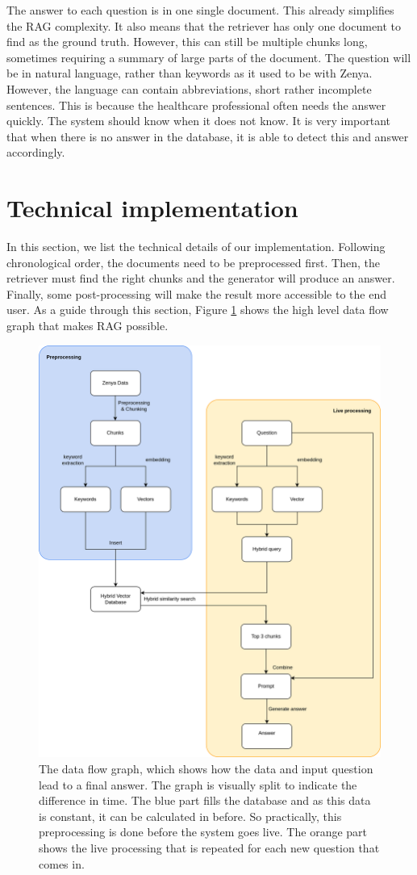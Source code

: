 The answer to each question is in one single document. This already simplifies the RAG complexity. It also means that the retriever has only one document to find as the ground truth. However, this can still be multiple chunks long, sometimes requiring a summary of large parts of the document.
The question will be in natural language, rather than keywords as it used to be with Zenya. However, the language can contain abbreviations, short rather incomplete sentences. This is because the healthcare professional often needs the answer quickly.
The system should know when it does not know. It is very important that when there is no answer in the database, it is able to detect this and answer accordingly.

\section{Technical implementation}
In this section, we list the technical details of our implementation. Following chronological order, the documents need to be preprocessed first. Then, the retriever must find the right chunks and the generator will produce an answer. Finally, some post-processing will make the result more accessible to the end user. As a guide through this section, Figure \ref{fig:dataflow_graph} shows the high level data flow graph that makes RAG possible.

\begin{figure}[H]
    \centerline{\includegraphics[width=0.8\linewidth]{fig/dataflow_graph.png}}
    \caption{The data flow graph, which shows how the data and input question lead to a final answer. The graph is visually split to indicate the difference in time. The blue part fills the database and as this data is constant, it can be calculated in before. So practically, this preprocessing is done before the system goes live. The orange part shows the live processing that is repeated for each new question that comes in.}
    \label{fig:dataflow_graph}
\end{figure}

